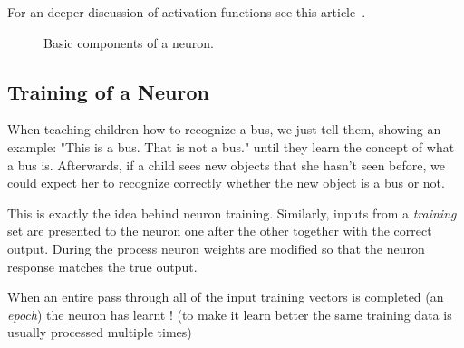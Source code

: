 For an deeper discussion of activation functions see this article~\cite{bib:activation_function}.

\begin{figure}[htb]
	\centering
	\caption{Basic components of a neuron.}
	\label{fig:sigmoid}
\end{figure}

\subsection{Training of a Neuron}\label{training-of-a-neuron}

When teaching children how to recognize a bus, we just tell them,
showing an example: "This is a bus. That is not a bus." until they
learn the concept of what a bus is. Afterwards, if a child sees new
objects that she hasn't seen before, we could expect her to recognize
correctly whether the new object is a bus or not.

This is exactly the idea behind neuron training. Similarly, inputs from a
\emph{training} set are presented to the neuron one after the other
together with the correct output. During the process neuron weights are modified
so that the neuron response matches the true output.

When an entire pass through all of the input training vectors is
completed (an \emph{epoch}) the neuron has learnt ! (to make it learn better the same
training data is usually processed multiple times)

